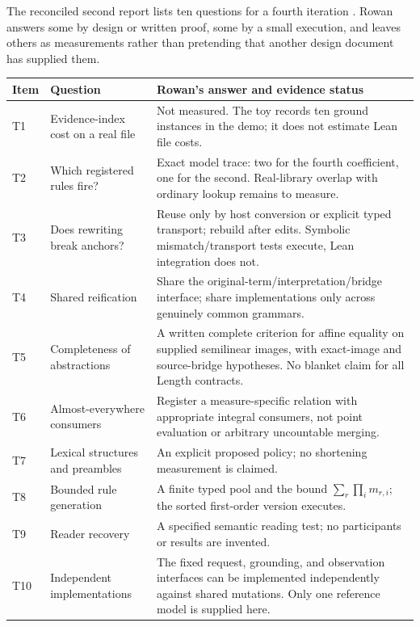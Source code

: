 \documentclass[11pt,letterpaper]{article}
\theoremstyle{definition}\newtheorem{definition}[theorem]{Definition}
\theoremstyle{remark}\newtheorem{remark}[theorem]{Remark}
\begin{document}
The reconciled second report lists ten questions for a fourth iteration
\cite{round3b}. Rowan answers some by design or written proof, some by a
small execution, and leaves others as measurements rather than pretending
that another design document has supplied them.
\begin{center}\small
\begin{tabularx}{\textwidth}{@{}l P{.26\textwidth}Y@{}}
\toprule Item & Question & Rowan's answer and evidence status\\\midrule
T1 & Evidence-index cost on a real file & Not measured. The toy records ten ground instances in the demo; it does not estimate Lean file costs.\\
T2 & Which registered rules fire? & Exact model trace: two for the fourth coefficient, one for the second. Real-library overlap with ordinary lookup remains to measure.\\
T3 & Does rewriting break anchors? & Reuse only by host conversion or explicit typed transport; rebuild after edits. Symbolic mismatch/transport tests execute, Lean integration does not.\\
T4 & Shared reification & Share the original-term/interpretation/bridge interface; share implementations only across genuinely common grammars.\\
T5 & Completeness of abstractions & A written complete criterion for affine equality on supplied semilinear images, with exact-image and source-bridge hypotheses. No blanket claim for all Length contracts.\\
T6 & Almost-everywhere consumers & Register a measure-specific relation with appropriate integral consumers, not point evaluation or arbitrary uncountable merging.\\
T7 & Lexical structures and preambles & An explicit proposed policy; no shortening measurement is claimed.\\
T8 & Bounded rule generation & A finite typed pool and the bound $\sum_r\prod_i m_{r,i}$; the sorted first-order version executes.\\
T9 & Reader recovery & A specified semantic reading test; no participants or results are invented.\\
T10 & Independent implementations & The fixed request, grounding, and observation interfaces can be implemented independently against shared mutations. Only one reference model is supplied here.\\
\bottomrule
\end{tabularx}
\end{center}
\end{document}
